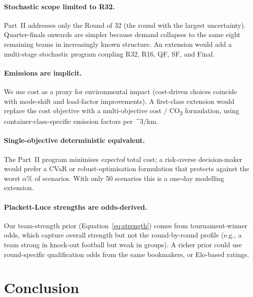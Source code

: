 \documentclass[11pt,a4paper]{article}
\numberwithin{equation}{section}
\newcommand{\mcube}{\text{m}^{3}}
\begin{document}
\paragraph{Stochastic scope limited to R32.} Part~II addresses only the Round of 32 (the round with the largest uncertainty). Quarter-finals onwards are simpler because demand collapses to the same eight remaining teams in increasingly known structure. An extension would add a multi-stage stochastic program coupling R32, R16, QF, SF, and Final.

\paragraph{Emissions are implicit.} We use cost as a proxy for environmental impact (cost-driven choices coincide with mode-shift and load-factor improvements). A first-class extension would replace the cost objective with a multi-objective cost / CO\textsubscript{2} formulation, using container-class-specific emission factors per~\mcube/km.

\paragraph{Single-objective deterministic equivalent.} The Part~II program minimises \emph{expected} total cost; a risk-averse decision-maker would prefer a CVaR or robust-optimisation formulation that protects against the worst $\alpha\%$ of scenarios. With only 50 scenarios this is a one-day modelling extension.

\paragraph{Plackett-Luce strengths are odds-derived.} Our team-strength prior (Equation~\ref{eq:strength}) comes from tournament-winner odds, which capture overall strength but not the round-by-round profile (e.g., a team strong in knock-out football but weak in groups). A richer prior could use round-specific qualification odds from the same bookmakers, or Elo-based ratings.

\section{Conclusion}\label{sec:conclusion}
\end{document}
